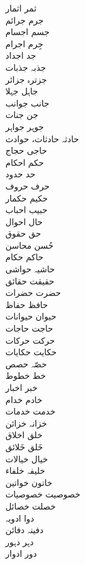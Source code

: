 \documentclass[a4paper]{article}
\begin{document}
\begin{multicols}{3}
\begin{tabbing}
ثمر \> اثمار\\
جرم \> جرائم\\
جسم \> اجسام\\
جِرم \> اجرام\\
جد \> اجداد\\
جذبہ \> جذبات\\
جزترہ \> جزائر\\
جاہل \> جہلا\\
جانب \> جوانب\\
جن \> جنات\\
جوہر \> جواہر\\
حادثہ \> حادثات، حوادث\\
حاجی \> حجاج\\
حکم \> احکام\\
حد \> حدود\\
حرف \> حروف\\
حکیم \> حکمار\\
حبیب \> احباب\\
حال \> احوال\\
حق \> حقوق\\
حُسن \> محاسن\\
حاکم \> حکام\\
حاشیہ \> حواشی\\
حقیقت \> حقائق\\
حضرت \> حضرات\\
حافظ \> حفاظ\\
حیوان \> حیوانات\\
حاجت \> حاجات\\
حرکت \> حرکات\\
حکایت \> حکایات\\
حصّہ \> حصص\\
خط \> خطوط\\
خبر \> اخبار\\
خادم \> خدام\\
خدمت \> خدمات\\
خزانہ \> خزائن\\
خلق \> اخلاق\\
خَلق \> خَلائق\\
خیال \> خیالات\\
خلیفہ \> خلفاء\\
خاتون \> خواتین\\
خصوصیت \> خصوصیات\\
خصلت \> خصائل\\
دوا \> ادویہ\\
دفینہ \> دفائن\\
دہر \> دہور\\
دور \> ادوار\\

\end{tabbing}
\end{multicols}
\end{document}
